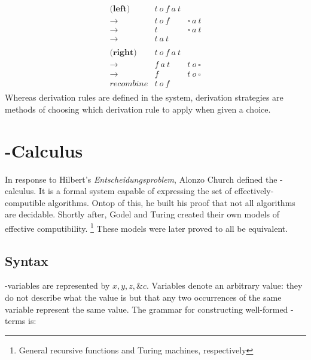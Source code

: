 \[
\begin{array}{rcl}
  
  \textbf{(left)} & t\ o\ f\ a\ t \\
  \to         & t\ o\ f & \square\ a\ t \\
  \to         & t       & \square\ a\ t \\
  \to         & t\ a\ t & \\
  \\
  \textbf{(right)}   & t\ o\ f\ a\ t \\
  \to                & f\ a\ t & t\ o\ \square \\
  \to                & f       & t\ o\ \square \\
  \textit{recombine} & t\ o\ f & \\
  
\end{array}
\]
Whereas derivation rules are defined in the system, 
derivation strategies are methods of choosing which derivation rule to apply when given a choice. 

\section{\lam-Calculus}

In response to Hilbert's \emph{Entscheidungsproblem}, Alonzo Church
defined the \lam-calculus. It is a formal system capable of expressing
the set of effectively-computible algorithms. Ontop of this, he built
his proof that not all algorithms are decidable. Shortly after, Godel
and Turing created their own models of effective computibility.
\footnote{General recursive functions and Turing machines, respectively} 
These models were later proved to all be equivalent.

\subsection{Syntax}
  
  \lam-variables are represented by $x,y,z,\&c$. Variables denote an
  arbitrary value: they do not describe what the value is but that any
  two occurrences of the same variable represent the same value. The
  grammar for constructing well-formed \lam-terms is:

  \begin{figure}[!h]
  \end{figure}

